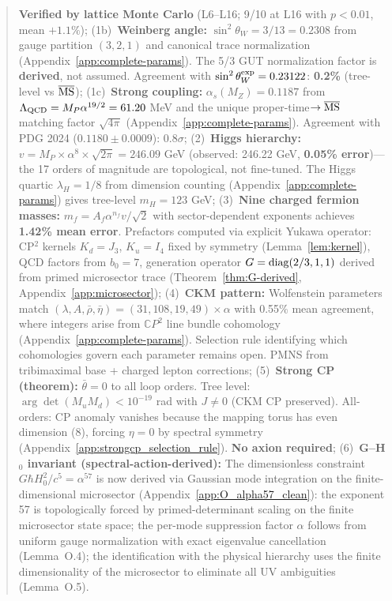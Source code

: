 \documentclass[aps,prd,twocolumn,superscriptaddress,showpacs,floatfix,nofootinbib]{revtex4-2}
\theoremstyle{plain}
\theoremstyle{definition}
\theoremstyle{remark}
\begin{document}
\begin{abstract}
\textbf{Verified by lattice Monte Carlo} (L6--L16; 9/10 at L16 with $p < 0.01$, mean $+1.1\%$);
%
(1b)~\textbf{Weinberg angle:} $\sin^2\theta_W = 3/13 = 0.2308$ from gauge partition $(3,2,1)$ and canonical trace normalization 
(Appendix~\ref{app:complete-params}). The 5/3 GUT normalization factor is \textbf{derived}, not assumed. 
Agreement with $\sin^2\theta_W^{\rm exp} = 0.23122$: \textbf{0.2\%} (tree-level vs $\overline{\rm MS}$);
%
(1c)~\textbf{Strong coupling:} $\alpha_s(M_Z) = 0.1187$ from $\Lambda_{\rm QCD} = M_P \alpha^{19/2} = 61.20$ MeV 
and the unique proper-time$\to\overline{\rm MS}$ matching factor $\sqrt{4\pi}$ (Appendix~\ref{app:complete-params}). 
Agreement with PDG 2024 ($0.1180 \pm 0.0009$): \textbf{$0.8\sigma$};
%
(2)~\textbf{Higgs hierarchy:} $v = M_P \times \alpha^8 \times \sqrt{2\pi} = 246.09$ GeV 
(observed: 246.22 GeV, \textbf{0.05\% error})---the 17 orders of magnitude are topological, not fine-tuned. 
The Higgs quartic $\lambda_H = 1/8$ from dimension counting (Appendix~\ref{app:complete-params}) gives tree-level $m_H = 123$ GeV;
%
(3)~\textbf{Nine charged fermion masses:} $m_f = A_f \alpha^{n_f} v/\sqrt{2}$ with sector-dependent exponents 
achieves \textbf{1.42\% mean error}. Prefactors computed via explicit Yukawa operator: CP$^2$ kernels 
$K_d = J_3$, $K_u = I_4$ fixed by symmetry (Lemma~\ref{lem:kernel}), QCD factors from $b_0 = 7$, 
generation operator $G = {\rm diag}(2/3,1,1)$ derived from primed microsector trace (Theorem~\ref{thm:G-derived}, Appendix~\ref{app:microsector});
%
(4)~\textbf{CKM pattern:} Wolfenstein parameters match 
$(\lambda, A, \bar{\rho}, \bar{\eta}) = (31, 108, 19, 49) \times \alpha$ with 0.55\% mean agreement, where integers 
arise from $\mathbb{C}P^2$ line bundle cohomology (Appendix~\ref{app:complete-params}). Selection rule identifying 
which cohomologies govern each parameter remains open. PMNS from tribimaximal base + charged lepton corrections;
%
(5)~\textbf{Strong CP (theorem):} $\bar\theta = 0$ to all loop orders. Tree level: $\arg\det(M_u M_d) < 10^{-19}$ rad 
with $J \neq 0$ (CKM CP preserved). All-orders: CP anomaly vanishes because the mapping torus has even dimension (8), 
forcing $\eta = 0$ by spectral symmetry (Appendix~\ref{app:strongcp_selection_rule}). \textbf{No axion required};
%
(6)~\textbf{G--H$_0$ invariant (spectral-action-derived):} The dimensionless constraint $G\hbar H_0^2/c^5 = \alpha^{57}$ is now derived 
via Gaussian mode integration on the finite-dimensional microsector (Appendix~\ref{app:O_alpha57_clean}): the exponent 57 is topologically forced by primed-determinant 
scaling on the finite microsector state space; the per-mode suppression factor $\alpha$ follows from uniform gauge normalization with exact eigenvalue cancellation (Lemma~O.4); the identification with the physical hierarchy uses the finite dimensionality of the microsector to eliminate all UV ambiguities (Lemma~O.5). 

\end{abstract}
\end{document}
